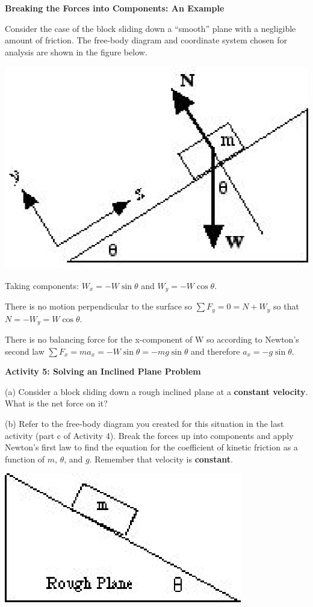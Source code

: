 \textbf{Breaking the Forces into Components: An Example} 

Consider the case of the block sliding down a ``smooth'' plane
with a negligible amount of friction. The free-body diagram and coordinate system
chosen for analysis are shown in the figure below.

\vspace{0.3cm}
{\par\centering \includegraphics{friction_fig6.eps} \par}
\vspace{0.3cm}

Taking components: \( W_{x}  = -W \sin  \theta  \) and \(W_{y} = -W
\cos  \theta  \).

There is no motion perpendicular to the surface so \( \sum F_y
= 0 = N + W_{y} \) so that $N = -W _{y}  = W \cos \theta$.

There is no balancing force for the x-component of W so according to Newton's
second law \( \sum F_{x}  = ma_{x} = -W \sin \theta
= - mg \sin \theta  \) and therefore \( a_{x} = - g \sin \theta  \).

\textbf{Activity 5: Solving an Inclined Plane Problem} 

(a) Consider a block sliding down a rough inclined plane at a \textbf{constant velocity}. What is the net force on it?
\vspace{20mm}

(b) Refer to the free-body diagram you created for this situation in the last
activity (part c of Activity 4). Break the forces up into components and apply Newton's first law to
find the equation for the coefficient of kinetic friction as a function of $m$,
\( \theta  \), and $g$. Remember that velocity is \textbf{constant}.

\vspace{0.3cm}
{\par\centering \includegraphics{friction_fig4.eps} \par}
\vspace{0.3cm}

